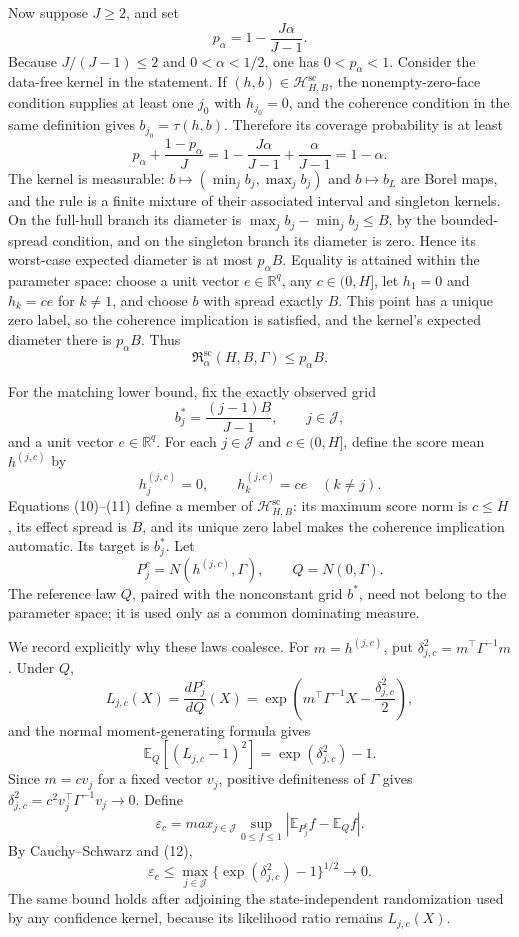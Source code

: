 Now suppose \(J\geq2\), and set
\[
 p_\alpha=1-\frac{J\alpha}{J-1}.
\]
Because \(J/(J-1)\leq2\) and \(0<\alpha<1/2\), one has \(0<p_\alpha<1\). Consider the data-free kernel in the statement. If \((h,b)\in\mathcal H_{H,B}^{\mathrm{sc}}\), the nonempty-zero-face condition supplies at least one \(j_0\) with \(h_{j_0}=0\), and the coherence condition in the same definition gives \(b_{j_0}=\tau(h,b)\). Therefore its coverage probability is at least
\[
 p_\alpha+\frac{1-p_\alpha}{J}
 =1-\frac{J\alpha}{J-1}+\frac{\alpha}{J-1}
 =1-\alpha.
 \tag{8}
\]
The kernel is measurable: \(b\mapsto(\min_j b_j,\max_j b_j)\) and \(b\mapsto b_L\) are Borel maps, and the rule is a finite mixture of their associated interval and singleton kernels.
On the full-hull branch its diameter is \(\max_j b_j-\min_j b_j\leq B\), by the bounded-spread condition, and on the singleton branch its diameter is zero. Hence its worst-case expected diameter is at most \(p_\alpha B\). Equality is attained within the parameter space: choose a unit vector \(e\in\mathbb R^q\), any \(c\in(0,H]\), let \(h_1=0\) and \(h_k=ce\) for \(k\neq1\), and choose \(b\) with spread exactly \(B\). This point has a unique zero label, so the coherence implication is satisfied, and the kernel's expected diameter there is \(p_\alpha B\). Thus
\[
 \mathfrak R_{\alpha}^{\mathrm{sc}}(H,B,\Gamma)\leq p_\alpha B.
 \tag{9}
\]

For the matching lower bound, fix the exactly observed grid
\[
 b_j^*=\frac{(j-1)B}{J-1},\qquad j\in\mathcal J,
 \tag{10}
\]
and a unit vector \(e\in\mathbb R^q\). For each \(j\in\mathcal J\) and \(c\in(0,H]\), define the score mean \(h^{(j,c)}\) by
\[
 h_j^{(j,c)}=0,
 \qquad
 h_k^{(j,c)}=ce\quad(k\neq j).
 \tag{11}
\]
Equations (10)--(11) define a member of \(\mathcal H_{H,B}^{\mathrm{sc}}\): its maximum score norm is \(c\leq H\), its effect spread is \(B\), and its unique zero label makes the coherence implication automatic. Its target is \(b_j^*\). Let
\[
 P_j^c=N(h^{(j,c)},\Gamma),
 \qquad
 Q=N(0,\Gamma).
\]
The reference law \(Q\), paired with the nonconstant grid \(b^*\), need not belong to the parameter space; it is used only as a common dominating measure.

We record explicitly why these laws coalesce. For \(m=h^{(j,c)}\), put \(\delta_{j,c}^2=m^{\top}\Gamma^{-1}m\). Under \(Q\),
\[
 L_{j,c}(X)=\frac{dP_j^c}{dQ}(X)
 =\exp\!\left(m^{\top}\Gamma^{-1}X-\frac{\delta_{j,c}^2}{2}\right),
\]
and the normal moment-generating formula gives
\[
 \mathbb E_Q[(L_{j,c}-1)^2]=\exp(\delta_{j,c}^2)-1.
 \tag{12}
\]
Since \(m=c v_j\) for a fixed vector \(v_j\), positive definiteness of \(\Gamma\) gives \(\delta_{j,c}^2=c^2v_j^{\top}\Gamma^{-1}v_j\to0\). Define
\[
 \varepsilon_c=max_{j\in\mathcal J}
 \sup_{0\leq f\leq1}
 \left|\mathbb E_{P_j^c}f-\mathbb E_Qf\right|.
\]
By Cauchy--Schwarz and (12),
\[
 \varepsilon_c
 \leq\max_{j\in\mathcal J}
 \{\exp(\delta_{j,c}^2)-1\}^{1/2}
 \longrightarrow0.
 \tag{13}
\]
The same bound holds after adjoining the state-independent randomization used by any confidence kernel, because its likelihood ratio remains \(L_{j,c}(X)\).

